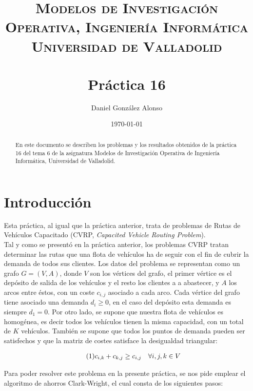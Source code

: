 \documentclass[a4paper,11pt]{article}
\title{
	\vspace{-25pt}
	\normalfont \Large \textsc{
		Modelos de Investigación Operativa,
        Ingeniería Informática\\
        Universidad de Valladolid
	}\\[10pt]
	\horrule{1pt}\\[10pt]
	\huge \textbf{
		Práctica 16
	}\\
	\horrule{1pt}
}
\author{
	\normalfont \Large Daniel González Alonso
}
\date{
	\normalfont \large \today
}
\newcommand\numberthis{							%
	\addtocounter{equation}{1}\tag{\theequation}
}
\begin{document}
\maketitle

\begin{abstract}
	En este documento se describen los problemas y los resultados obtenidos de la práctica 16 del tema 6 de la asignatura Modelos de Investigación Operativa de Ingeniería Informática, Universidad de Valladolid.
\end{abstract}

\section{Introducción}
Esta práctica, al igual que la práctica anterior, trata de problemas de Rutas de Vehículos Capacitado (CVRP, \textit{Capacited Vehicle Routing Problem}).\\


Tal y como se presentó en la práctica anterior, los problemas CVRP tratan determinar las rutas que una flota de vehículos ha de seguir con el fin de cubrir la demanda de todos sus clientes. Los datos del problema se representan como un grafo ${G=(V,A)}$, donde ${V}$ son los vértices del grafo, el primer vértice es el depósito de salida de los vehículos y el resto los clientes a a abastecer, y ${A}$ los arcos entre éstos, con un coste ${c_{i,j}}$ asociado a cada arco. Cada vértice del grafo tiene asociado una demanda ${d_{i} \geq 0}$, en el caso del depósito esta demanda es siempre ${d_{1}=0}$. Por otro lado, se supone que nuestra flota de vehículos es homogénea, es decir todos los vehículos tienen la misma capacidad, con un total de ${K}$ vehículos. También se supone que todos los puntos de demanda pueden ser satisfechos y que la matriz de costes satisface la desigualdad triangular:

\begin{align*}\numberthis
	\label{desigualdad_triangular}
	c_{i,k} + c_{k,j} \geq c_{i,j}	&& \forall i,j,k \in V \\
\end{align*}

Para poder resolver este problema en la presente práctica, se nos pide emplear el algoritmo de ahorros Clark-Wright, el cual consta de los siguientes pasos:
\end{document}
